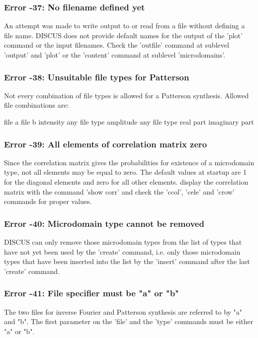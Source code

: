 \subsubsection{Error -37: No filename defined yet}
\par
An attempt was made to write output to or read from a file without 
defining a file name. DISCUS does not provide default names for the 
output of the 'plot' command or the input filenames. Check the 
'outfile' command at sublevel 'output' and 'plot' or the 'content' 
command at sublevel 'microdomains'. 
\subsubsection{Error -38: Unsuitable file types for Patterson}
\par
Not every combination of file types is allowed for a Patterson 
synthesis. Allowed file combinations are: 
\par
\begin{MacVerbatim}
  file  a     file b
  intensity   any file type
  amplitude   any file type
  real part   imaginary part
\end{MacVerbatim}
\subsubsection{Error -39: All elements of correlation matrix zero}
\par
Since the correlation matrix gives the probabilities for existence 
of a microdomain type, not all elements may be equal to zero. The 
default values at startup are 1 for the diagonal elements and zero 
for all other elements. display the correlation matrix with the 
command 'show corr' and check the 'ccol', 'cele' and 'crow' commands 
for proper values. 
\subsubsection{Error -40: Microdomain type cannot be removed}
\par
DISCUS can only remove those microdomain types from the list of types 
that have not yet been used by the 'create' command, i.e. only those 
microdomain types that have been inserted into the list by the 'insert' 
command after the last 'create' command. 
\subsubsection{Error -41: File specifier must be "a" or "b"}
\par
The two files for inverse Fourier and Patterson synthesis are 
referred to by "a" and "b". The first parameter on the 'file' and 
the 'type' commands must be either "a" or "b". 

